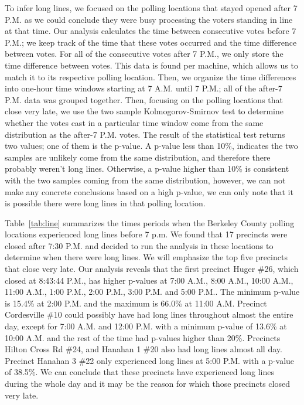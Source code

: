 To infer long lines, we focused on the polling locations that stayed opened after 7 P.M. as we could conclude they were busy processing the voters standing in line at that time. Our analysis calculates the time between consecutive votes before 7 P.M.; we keep track of the time that these votes occurred and the time difference between votes.  For all of the consecutive votes after 7 P.M., we only store the time difference between votes.  This data is found per machine, which allows us to match it to its respective polling location.  Then, we organize the time differences into one-hour time windows starting at 7 A.M. until 7 P.M.; all of the after-7 P.M. data was grouped together.  Then, focusing on the polling locations that close very late, we use the two sample Kolmogorov-Smirnov test to determine whether the votes cast in a particular time window come from the same distribution as the after-7 P.M. votes.  The result of the statistical test returns two values; one of them is the p-value. A p-value less than 10\%, indicates the two samples are unlikely come from the same distribution, and therefore there probably weren't long lines.  Otherwise, a p-value higher than 10\% is consistent with the two samples coming from the same distribution, however, we can not make any concrete conclusions based on a high p-value, we can only note that it is possible there were long lines in that polling location.

Table~\ref{tab:line} summarizes the times periods when the Berkeley County polling locations experienced long lines before 7 p.m. We found that 17 precincts were closed after 7:30 P.M. and decided to run the analysis in these locations to determine when there were long lines.  We will emphasize the top five precincts that close very late.  Our analysis reveals that the first precinct Huger \#26, which closed at 8:43:44 P.M., has higher p-values at 7:00 A.M., 8:00 A.M., 10:00 A.M., 11:00 A.M., 1:00 P.M., 2:00 P.M., 3:00 P.M. and 5:00 P.M..  The minimum p-value is 15.4\% at 2:00 P.M. and the maximum is 66.0\% at 11:00 A.M.  Precinct Cordesville \#10 could possibly have had long lines throughout almost the entire day, except for 7:00 A.M. and 12:00 P.M. with a minimum p-value of 13.6\% at 10:00 A.M. and the rest of the time had p-values higher than 20\%.  Precincts Hilton Cross Rd \#24, and Hanahan 1 \#20 also had long lines almost all day.  Precinct Hanahan 3 \#22 only experienced long lines at 5:00 P.M. with a p-value of 38.5\%.  We can conclude that these precincts have experienced long lines during the whole day and it may be the reason for which those precincts closed very late.

